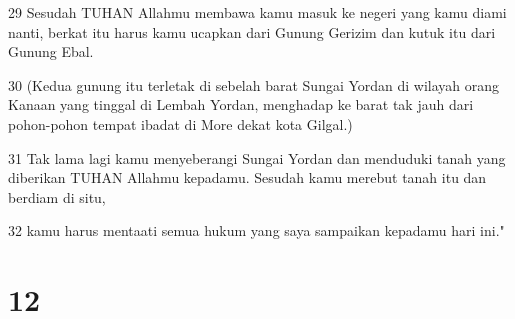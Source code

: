 \par 29 Sesudah TUHAN Allahmu membawa kamu masuk ke negeri yang kamu diami nanti, berkat itu harus kamu ucapkan dari Gunung Gerizim dan kutuk itu dari Gunung Ebal.
\par 30 (Kedua gunung itu terletak di sebelah barat Sungai Yordan di wilayah orang Kanaan yang tinggal di Lembah Yordan, menghadap ke barat tak jauh dari pohon-pohon tempat ibadat di More dekat kota Gilgal.)
\par 31 Tak lama lagi kamu menyeberangi Sungai Yordan dan menduduki tanah yang diberikan TUHAN Allahmu kepadamu. Sesudah kamu merebut tanah itu dan berdiam di situ,
\par 32 kamu harus mentaati semua hukum yang saya sampaikan kepadamu hari ini."

\chapter{12}

